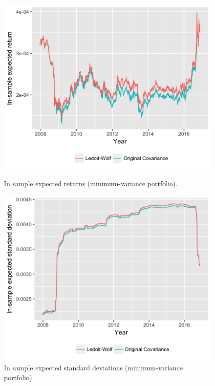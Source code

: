 \documentclass[letterpaper,12pt]{article}
\begin{document}
\begin{figure}[!tbp]
  \centering
  \begin{minipage}[t]{0.45\textwidth}
    \includegraphics[width=\textwidth]{fig_min_variance_ins_r.png}
    \caption{In sample expected returns (minimum-variance portfolio).\label{fig:fig_min_variance_ins_r}}
  \end{minipage}
  \hfill
  \begin{minipage}[t]{0.45\textwidth}
    \includegraphics[width=\textwidth]{fig_min_variance_ins_std.png}
    \caption{In sample expected standard deviations (minimum-variance portfolio).\label{fig:fig_min_variance_ins_std}}
  \end{minipage}
\end{figure}
\end{document}

